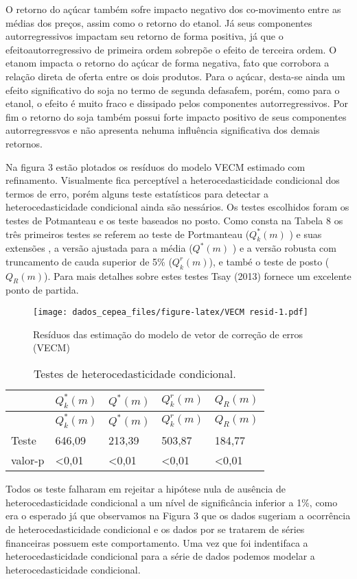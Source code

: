 O retorno do açúcar também sofre impacto negativo dos co-movimento entre
as médias dos preços, assim como o retorno do etanol. Já seus
componentes autorregressivos impactam seu retorno de forma positiva, já
que o efeitoautorregressivo de primeira ordem sobrepõe o efeito de
terceira ordem. O etanom impacta o retorno do açúcar de forma negativa,
fato que corrobora a relação direta de oferta entre os dois produtos.
Para o açúcar, desta-se ainda um efeito significativo do soja no termo
de segunda defasafem, porém, como para o etanol, o efeito é muito fraco
e dissipado pelos componentes autorregressivos. Por fim o retorno do
soja também possui forte impacto positivo de seus componentes
autorregressvos e não apresenta nehuma influência significativa dos
demais retornos.

Na figura 3 estão plotados os resíduos do modelo VECM estimado com
refinamento. Visualmente fica perceptível a heterocedasticidade
condicional dos termos de erro, porém alguns teste estatísticos para
detectar a heterocedasticidade condicional ainda são nessários. Os
testes escolhidos foram os testes de Potmanteau e os teste baseados no
posto. Como consta na Tabela 8 os três primeiros testes se referem ao
teste de Portmanteau (\(Q^*_k(m)\) ) e suas extensões , a versão
ajustada para a média (\(Q^*(m)\) ) e a versão robusta com truncamento
de cauda superior de 5\% (\(Q^r_k(m)\)), e també o teste de posto
(\(Q_R(m)\)). Para mais detalhes sobre estes testes Tsay (2013) fornece
um excelente ponto de partida.

\begin{figure}[htbp]
\centering
\texttt{[image: dados\_cepea\_files/figure-latex/VECM resid-1.pdf]}
\caption{Resíduos das estimação do modelo de vetor de correção de erros
(VECM)}
\end{figure}

\begin{longtable}[]{@{}lllll@{}}
\caption{Testes de heterocedasticidade condicional.}\tabularnewline
\toprule
& \(Q^*_k(m)\) & \(Q^*(m)\) & \(Q^r_k(m)\) & \(Q_R(m)\)\tabularnewline
\midrule
\endfirsthead
\toprule
& \(Q^*_k(m)\) & \(Q^*(m)\) & \(Q^r_k(m)\) & \(Q_R(m)\)\tabularnewline
\midrule
\endhead
Teste & 646,09 & 213,39 & 503,87 & 184,77\tabularnewline
valor-p & \textless{}0,01 & \textless{}0,01 & \textless{}0,01 &
\textless{}0,01\tabularnewline
\bottomrule
\end{longtable}

Todos os teste falharam em rejeitar a hipótese nula de ausência de
heterocedasticidade condicional a um nível de significância inferior a
1\%, como era o esperado já que observamos na Figura 3 que os dados
sugeriam a ocorrência de heterocedasticidade condicional e os dados por
se tratarem de séries financeiras possuem este comportamento. Uma vez
que foi indentifaca a heterocedasticidade condicional para a série de
dados podemos modelar a heterocedasticidade condicional.

